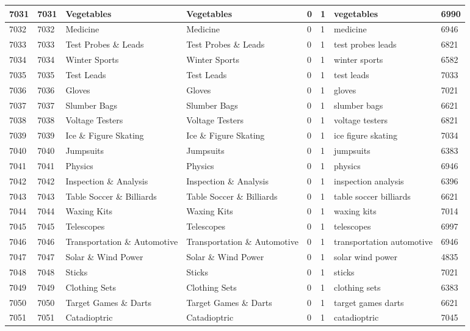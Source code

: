 \begin{longtable}{|l|l|l|l|l|l|l|l|}
7031 & 7031 & Vegetables & Vegetables & 0 & 1 & vegetables & 6990 \\ \hline 
7032 & 7032 & Medicine & Medicine & 0 & 1 & medicine & 6946 \\ \hline 
7033 & 7033 & Test Probes \& Leads & Test Probes \& Leads & 0 & 1 & test probes leads & 6821 \\ \hline 
7034 & 7034 & Winter Sports & Winter Sports & 0 & 1 & winter sports & 6582 \\ \hline 
7035 & 7035 & Test Leads & Test Leads & 0 & 1 & test leads & 7033 \\ \hline 
7036 & 7036 & Gloves & Gloves & 0 & 1 & gloves & 7021 \\ \hline 
7037 & 7037 & Slumber Bags & Slumber Bags & 0 & 1 & slumber bags & 6621 \\ \hline 
7038 & 7038 & Voltage Testers & Voltage Testers & 0 & 1 & voltage testers & 6821 \\ \hline 
7039 & 7039 & Ice \& Figure Skating & Ice \& Figure Skating & 0 & 1 & ice figure skating & 7034 \\ \hline 
7040 & 7040 & Jumpsuits & Jumpsuits & 0 & 1 & jumpsuits & 6383 \\ \hline 
7041 & 7041 & Physics & Physics & 0 & 1 & physics & 6946 \\ \hline 
7042 & 7042 & Inspection \& Analysis & Inspection \& Analysis & 0 & 1 & inspection analysis & 6396 \\ \hline 
7043 & 7043 & Table Soccer \& Billiards & Table Soccer \& Billiards & 0 & 1 & table soccer billiards & 6621 \\ \hline 
7044 & 7044 & Waxing Kits & Waxing Kits & 0 & 1 & waxing kits & 7014 \\ \hline 
7045 & 7045 & Telescopes & Telescopes & 0 & 1 & telescopes & 6997 \\ \hline 
7046 & 7046 & Transportation \& Automotive & Transportation \& Automotive & 0 & 1 & transportation automotive & 6946 \\ \hline 
7047 & 7047 & Solar \& Wind Power & Solar \& Wind Power & 0 & 1 & solar wind power & 4835 \\ \hline 
7048 & 7048 & Sticks & Sticks & 0 & 1 & sticks & 7021 \\ \hline 
7049 & 7049 & Clothing Sets & Clothing Sets & 0 & 1 & clothing sets & 6383 \\ \hline 
7050 & 7050 & Target Games \& Darts & Target Games \& Darts & 0 & 1 & target games darts & 6621 \\ \hline 
7051 & 7051 & Catadioptric & Catadioptric & 0 & 1 & catadioptric & 7045 \\ \hline 

\end{longtable}
